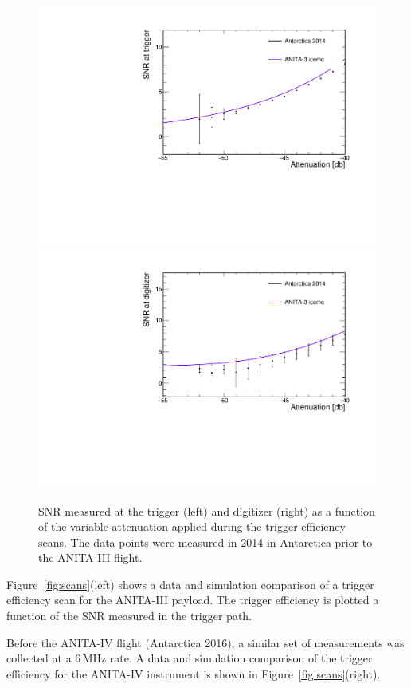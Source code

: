 \begin{figure}[!h]\centering
  \includegraphics[width=.45\linewidth]{./Figs/EfficiencyScanNoDelaysA3_snrTriggerVSattenuation.pdf} 
  \includegraphics[width=.45\linewidth]{./Figs/EfficiencyScanNoDelaysA3_snrDigitizerVSattenuation.pdf}
  \caption{SNR measured at the trigger (left) and digitizer (right) as
  a function of the variable attenuation applied during the trigger
  efficiency scans. The data points were measured in 2014 in Antarctica prior to the
  ANITA-III flight.
}
  \label{fig:scan_snr}
\end{figure}

Figure~\ref{fig:scans}(left) shows a data and simulation comparison of a trigger
efficiency scan for the ANITA-III payload.
The trigger efficiency is plotted a function of the SNR
measured in the trigger path.

Before the ANITA-IV flight (Antarctica 2016), a similar set of measurements was collected at a 6\,MHz rate. 
A data and simulation comparison of the trigger efficiency for the ANITA-IV instrument is shown in Figure~\ref{fig:scans}(right).


